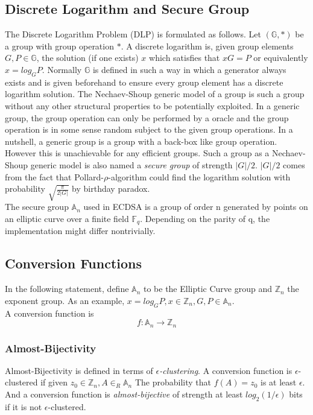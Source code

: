 \documentclass[18]{article}
\begin{document}
\subsection{Discrete Logarithm and Secure Group}
The Discrete Logarithm Problem (DLP) is formulated as follows.
Let $(\mathbb{G}, *)$ be a group with group operation $*$.
A discrete logarithm is, given group elements $G,P \in \mathbb{G}$,
the solution (if one exists) $x$ which satisfies that $xG=P$
or equivalently $x=log_GP$.
Normally $\mathbb{G}$ is defined in such a way in which
 a generator always exists and is given beforehand
 to ensure every group element has a discrete logarithm solution.
The Nechaev-Shoup generic model of a group is such a group without
 any other structural properties to be potentially exploited.
 In a generic group, the group operation can only be performed by a oracle
 and the group operation is in some sense random subject
 to the given group operations. In a nutshell, a generic group is a group with a back-box like group operation.
 However this is unachievable for any efficient groups.
  Such a group as a Nechaev-Shoup generic model is also named a \textit{secure group} of strength $|G|/2$. $|G|/2$ comes from the fact that Pollard-$\rho$-algorithm could find the logarithm solution with probability $\sqrt{\frac{\pi}{2|G|}}$ by birthday paradox.\\
  The secure group $\mathbb{A}_n$ used in ECDSA is a group of order n generated by points on an elliptic curve over a finite field $\mathbb{F}_q$.
  Depending on the parity of q, the implementation might differ nontrivially.

\subsection{Conversion Functions}
  In the following statement, define $\mathbb{A}_n$ to be the
  Elliptic Curve group and $\mathbb{Z}_n$ the exponent group.
  As an example, $x=log_GP, x \in \mathbb{Z}_n, G,P \in \mathbb{A}_n$.\\
  A conversion function is
  \begin{equation}
  f:\mathbb{A}_n \to \mathbb{Z}_n
  \end{equation}
\subsubsection{Almost-Bijectivity}
Almost-Bijectivity is defined in terms of \textit{$\epsilon$-clustering}.
A conversion function is $\epsilon$-clustered if given
$z_0 \in \mathbb{Z}_n, A \in _R \mathbb{A}_n$
The probability that
$f(A)=z_0$ is at least $\epsilon$. And a conversion function is \textit{almost-bijective} of strength at least $log_2(1/\epsilon)$ bits if  it is not $\epsilon$-clustered.
\end{document}

